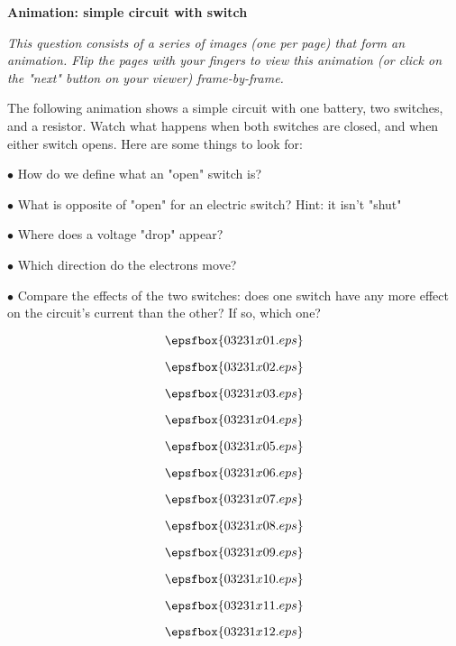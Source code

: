 

\centerline{\bf Animation: simple circuit with switch}

\vskip 10pt

{\it This question consists of a series of images (one per page) that form an animation.  Flip the pages with your fingers to view this animation (or click on the "next" button on your viewer) frame-by-frame.}

\vskip 10pt

The following animation shows a simple circuit with one battery, two switches, and a resistor.  Watch what happens when both switches are closed, and when either switch opens.  Here are some things to look for:

\medskip
\goodbreak
\item{$\bullet$} How do we define what an "open" switch is?
\item{$\bullet$} What is opposite of "open" for an electric switch?  Hint: it isn't "shut"
\item{$\bullet$} Where does a voltage "drop" appear?
\item{$\bullet$} Which direction do the electrons move?
\item{$\bullet$} Compare the effects of the two switches: does one switch have any more effect on the circuit's current than the other?  If so, which one?
\medskip

\vfil \eject
$$\epsfbox{03231x01.eps}$$

\vfil \eject
$$\epsfbox{03231x02.eps}$$

\vfil \eject
$$\epsfbox{03231x03.eps}$$

\vfil \eject
$$\epsfbox{03231x04.eps}$$

\vfil \eject
$$\epsfbox{03231x05.eps}$$

\vfil \eject
$$\epsfbox{03231x06.eps}$$

\vfil \eject
$$\epsfbox{03231x07.eps}$$

\vfil \eject
$$\epsfbox{03231x08.eps}$$

\vfil \eject
$$\epsfbox{03231x09.eps}$$

\vfil \eject
$$\epsfbox{03231x10.eps}$$

\vfil \eject
$$\epsfbox{03231x11.eps}$$

\vfil \eject
$$\epsfbox{03231x12.eps}$$

